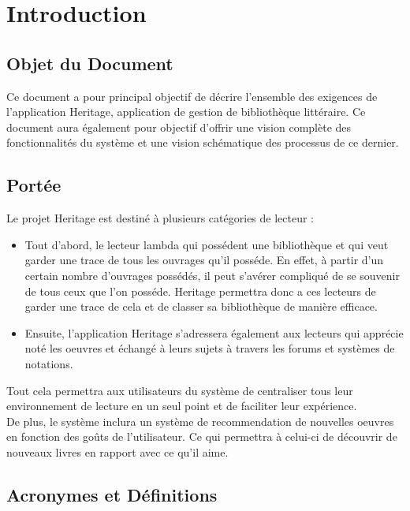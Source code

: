 \documentclass[a4paper, 12pt]{article}
\begin{document}
    \tableofcontents

    \newpage

    \section{Introduction}
        \subsection{Objet du Document}
        Ce document a pour principal objectif de décrire l'ensemble des exigences de l'application Heritage, application de gestion de bibliothèque littéraire. Ce document aura également pour objectif d'offrir une vision complète des fonctionnalités du système et une vision schématique des processus de ce dernier.
        
        \subsection{Portée}
        Le projet Heritage est destiné à plusieurs catégories de lecteur : 
        \begin{itemize}
            \item Tout d'abord, le lecteur lambda qui possédent une bibliothèque et qui veut garder une trace de tous les ouvrages qu'il posséde. En effet, à partir d'un certain nombre d'ouvrages possédés, il peut s'avérer compliqué de se souvenir de tous ceux que l'on posséde. Heritage permettra donc a ces lecteurs de garder une trace de cela et de classer sa bibliothèque de manière efficace.
            \item Ensuite, l'application Heritage s'adressera également aux lecteurs qui apprécie noté les oeuvres et échangé à leurs sujets à travers les forums et systèmes de notations.
        \end{itemize}
        Tout cela permettra aux utilisateurs du système de centraliser tous leur environnement de lecture en un seul point et de faciliter leur expérience. \\
        De plus, le système inclura un système de recommendation de nouvelles oeuvres en fonction des goûts de l'utilisateur. Ce qui permettra à celui-ci de découvrir de nouveaux livres en rapport avec ce qu'il aime. 

        \subsection{Acronymes et Définitions}
\end{document}
